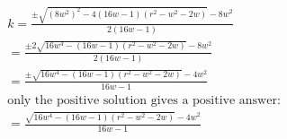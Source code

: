 \documentclass[12pt]{report}
\numberwithin{equation}{section}
\begin{document}
\begin{align*}
k = \frac{\pm \sqrt{\left(8 w^2\right)^2-4 (16 w-1) \left(r^2-w^2-2 w\right)}-8 w^2}{2(16 w-1)} \\
=\frac{\pm 2 \sqrt{16 w^4- (16 w-1) \left(r^2-w^2-2 w\right)}-8 w^2}{2(16 w-1)} \\
=\frac{\pm \sqrt{16 w^4- (16 w-1) \left(r^2-w^2-2 w\right)}-4 w^2}{16 w-1} \\
\text{only the positive solution gives a positive answer:} \\
= \frac{ \sqrt{16 w^4- (16 w-1) \left(r^2-w^2-2 w\right)}-4 w^2}{16 w-1}
\end{align*}





\newpage


%
\end{document}
